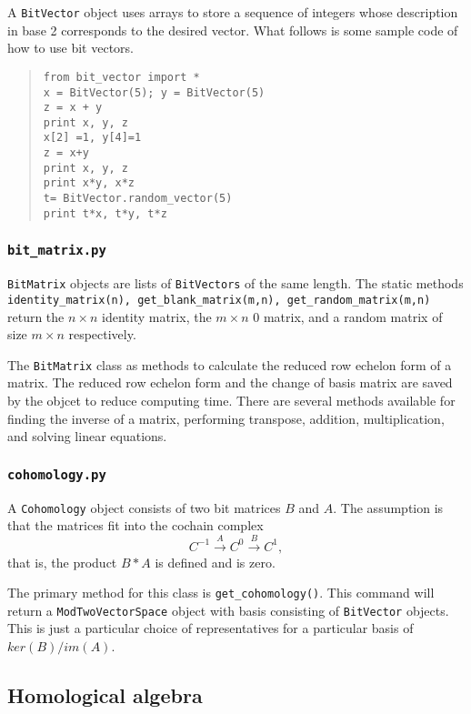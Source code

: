 \documentclass{article}
\begin{document}
A {\tt BitVector} object uses arrays to store a sequence of integers
whose description in base 2 corresponds to the desired vector. What follows is some sample code of how to use bit vectors. 

\begin{quote}
\begin{verbatim}
from bit_vector import *
x = BitVector(5); y = BitVector(5)
z = x + y
print x, y, z
x[2] =1, y[4]=1
z = x+y
print x, y, z
print x*y, x*z
t= BitVector.random_vector(5)
print t*x, t*y, t*z
\end{verbatim}
\end{quote}

\subsubsection{{\tt bit\_matrix.py}} 

{\tt BitMatrix} objects are lists of {\tt BitVectors} of the same
length. The static methods {\tt identity\_matrix(n),
  get\_blank\_matrix(m,n), get\_random\_matrix(m,n)} return the
$n\times n$ identity matrix, the $m\times n$ $0$ matrix, and a random
matrix of size $m \times n$ respectively.

The {\tt BitMatrix} class as methods to calculate the reduced row
echelon form of a matrix. The reduced row echelon form and the change
of basis matrix are saved by the objcet to reduce computing
time. There are several methods available for finding the inverse of a
matrix, performing transpose, addition, multiplication, and solving
linear equations.

\subsubsection{{\tt cohomology.py}}

A {\tt Cohomology} object consists of two bit matrices $B$ and
$A$. The assumption is that the matrices fit into the cochain complex
\begin{equation*}
  C^{-1} \xrightarrow{A} C^0 \xrightarrow{B} C^{1},
\end{equation*}
that is, the product $B*A$ is defined and is zero. 

The primary method for this class is {\tt get\_cohomology()}. This
command will return a {\tt ModTwoVectorSpace} object with basis
consisting of {\tt BitVector} objects. This is just a particular
choice of representatives for a particular basis of $ker(B)/im(A)$.

\subsection{Homological algebra}
\end{document}
